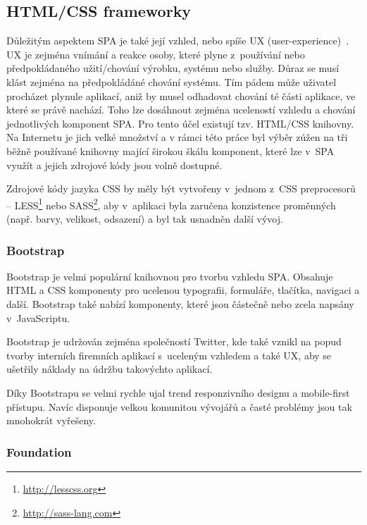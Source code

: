 \newpage

\subsection{HTML/CSS frameworky}

Důležitým aspektem SPA je také její vzhled, nebo spíše UX (user-experience)~\cite{ux:iso}. UX je zejména vnímání a reakce osoby, které plyne z~používání nebo předpokládaného užití/chování výrobku, systému nebo služby. Důraz se musí klást zejména na předpokládáné chování systému. Tím pádem může uživatel procházet plynule aplikací, aniž by musel odhadovat chování té části aplikace, ve které se právě nachází. Toho lze dosáhnout zejména uceleností vzhledu a chování jednotlivých komponent SPA. Pro tento účel existují tzv. HTML/CSS knihovny. Na Internetu je jich velké množství a v rámci této práce byl výběr zúžen na tři běžně používané knihovny mající širokou škálu komponent, které lze v~SPA využít a jejich zdrojové kódy jsou volně dostupné.

Zdrojové kódy jazyka CSS by měly být vytvořeny v~jednom z~CSS preprocesorů~\cite{css:preproc} -- LESS\footnote{\url{http://lesscss.org}} nebo SASS\footnote{\url{http://sass-lang.com}}, aby v~aplikaci byla zaručena konzistence proměnných (např. barvy, velikost, odsazení) a byl tak usnadněn další vývoj.

\subsubsection*{Bootstrap}

Bootstrap je velmi populární knihovnou pro tvorbu vzhledu SPA. Obsahuje HTML a CSS komponenty pro ucelenou typografii, formuláře, tlačítka, navigaci a další. Bootstrap také nabízí komponenty, které jsou částečně nebo zcela napsány v~JavaScriptu.

Bootstrap je udržován zejména společností Twitter, kde také vznikl na popud tvorby interních firemních aplikací s~uceleným vzhledem a také UX, aby se ušetřily náklady na údržbu takovýchto aplikací.

Díky Bootstrapu se velmi rychle ujal trend responzivního designu a mobile-first přístupu. Navíc disponuje velkou komunitou vývojářů a časté problémy jsou tak mnohokrát vyřešeny.

\subsubsection*{Foundation}

